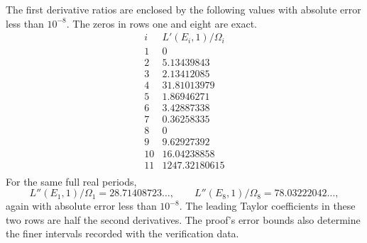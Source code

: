 \begin{proposition}\hypertarget{tag-0011}{}\label{ari:C.6.R2}

The first derivative ratios are enclosed by the following values
with absolute error less than $10^{-8}$. The zeros in rows one
and eight are exact.
\[
\begin{array}{r|r}
i&L'(E_i,1)/\Omega_i\\\hline
1&0\\
2&5.13439843\\
3&2.13412085\\
4&31.81013979\\
5&1.86946271\\
6&3.42887338\\
7&0.36258335\\
8&0\\
9&9.62927392\\
10&16.04238858\\
11&1247.32180615\\
\end{array}
\]
For the same full real periods,
\[
 L''(E_1,1)/\Omega_1=28.71408723\ldots,\qquad
 L''(E_8,1)/\Omega_8=78.03222042\ldots,
\]
again with absolute error less than $10^{-8}$.
The leading Taylor coefficients in these two rows are half
the second derivatives. The proof's error bounds also determine
the finer intervals recorded with the verification data.
\end{proposition}


